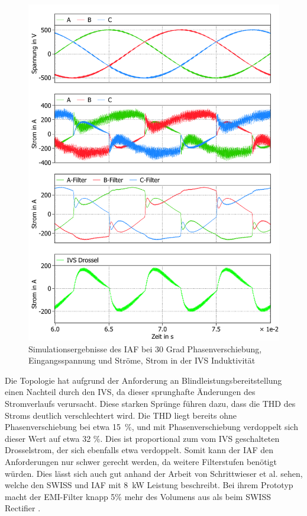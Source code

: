 		\begin{figure}
			\centering
			\includegraphics[width=1\linewidth]{content/Grafiken/IAF_AC+L_30Grad}
			\caption{Simulationsergebnisse des IAF bei 30 Grad Phasenverschiebung, Eingangsspannung und Ströme, Strom in der IVS Induktivität }
			\label{fig:iafacl30grad}
		\end{figure}
		Die Topologie hat aufgrund der Anforderung an Blindleistungsbereitstellung einen Nachteil durch den IVS, da dieser sprunghafte Änderungen des Stromverlaufs verursacht. Diese starken Sprünge führen dazu, dass die THD des Stroms deutlich verschlechtert wird. Die THD liegt bereits ohne Phasenverschiebung bei etwa 15~\%, und mit Phasenverschiebung verdoppelt sich dieser Wert auf etwa 32 \%. Dies ist proportional zum vom \gls{IVS} geschalteten Drosselstrom, der sich ebenfalls etwa verdoppelt.  Somit kann der IAF den Anforderungen nur schwer gerecht werden, da weitere Filterstufen benötigt würden. Dies lässt sich auch gut anhand der Arbeit von Schrittwieser et al. sehen, welche den SWISS und \gls{IAF} mit 8~kW Leistung beschreibt. Bei ihrem Prototyp macht der EMI-Filter knapp 5\% mehr des Volumens aus als beim SWISS Rectifier \cite{IAF99}.
		

